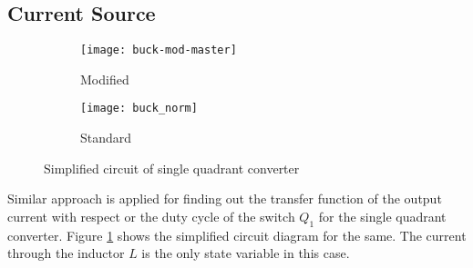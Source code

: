 \subsection{Current Source}
	\begin{figure}[H]
		\begin{subfigure}{0.49\textwidth}
			\centering
			\texttt{[image: buck-mod-master]}
			\caption{Modified}
			\label{fig:working-5}
		\end{subfigure}
		\begin{subfigure}{0.49\textwidth}
			\centering
			\texttt{[image: buck\_norm]}
			\caption{Standard}
			\label{fig:working-5b}
		\end{subfigure}
		\caption{Simplified circuit of single quadrant converter}
		\label{fig:buck-comparison}
	\end{figure}
	Similar approach is applied for finding out the transfer function of the output current with respect or the duty cycle of the switch $Q_1$ for the single quadrant converter. Figure \ref{fig:working-5} shows the simplified circuit diagram for the same. The current through the inductor $L$ is the only state variable in this case.

